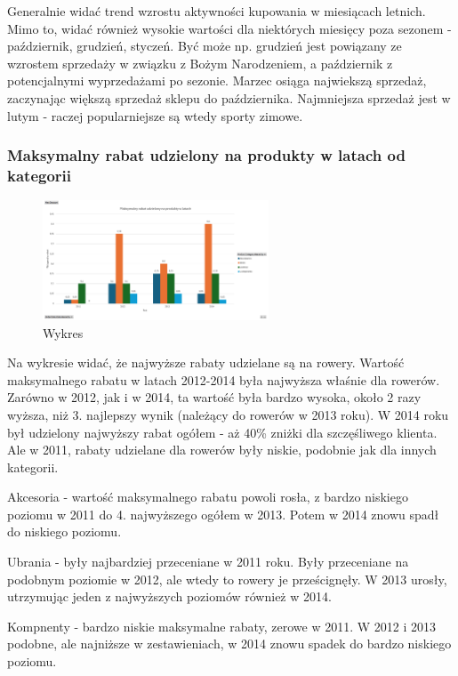 \documentclass[a4paper,12pt]{article}
\begin{document}
Generalnie widać trend wzrostu aktywności kupowania w miesiącach letnich. Mimo to, widać również wysokie wartości dla niektórych miesięcy poza sezonem - październik, grudzień, styczeń. Być może np. grudzień jest powiązany ze wzrostem sprzedaży w związku z Bożym Narodzeniem, a październik z potencjalnymi wyprzedażami po sezonie. Marzec osiąga najwiekszą sprzedaż, zaczynając większą sprzedaż sklepu do października. Najmniejsza sprzedaż jest w lutym - raczej popularniejsze są wtedy sporty zimowe.

\subsubsection{Maksymalny rabat udzielony na produkty w latach od kategorii}

\begin{figure}[H]
  \includegraphics[width=0.6\textwidth]{images/max_discount.png}
  \caption{Wykres}
\end{figure}

Na wykresie widać, że najwyższe rabaty udzielane są na rowery. Wartość maksymalnego rabatu w latach 2012-2014 była najwyższa właśnie dla rowerów. Zarówno w 2012, jak i w 2014, ta wartość była bardzo wysoka, około 2 razy wyższa, niż 3. najlepszy wynik (należący do rowerów w 2013 roku). W 2014 roku był udzielony najwyższy rabat ogółem - aż 40\% zniżki dla szczęśliwego klienta.
Ale w 2011, rabaty udzielane dla rowerów były niskie, podobnie jak dla innych kategorii.

Akcesoria - wartość maksymalnego rabatu powoli rosła, z bardzo niskiego poziomu w 2011 do 4. najwyższego ogółem w 2013. Potem w 2014 znowu spadł do niskiego poziomu.

Ubrania - były najbardziej przeceniane w 2011 roku. Były przeceniane na podobnym poziomie w 2012, ale wtedy to rowery je prześcignęły. W 2013 urosły, utrzymując jeden z najwyższych poziomów również w 2014.

Kompnenty - bardzo niskie maksymalne rabaty, zerowe w 2011. W 2012 i 2013 podobne, ale najniższe w zestawieniach, w 2014 znowu spadek do bardzo niskiego poziomu.
\end{document}
